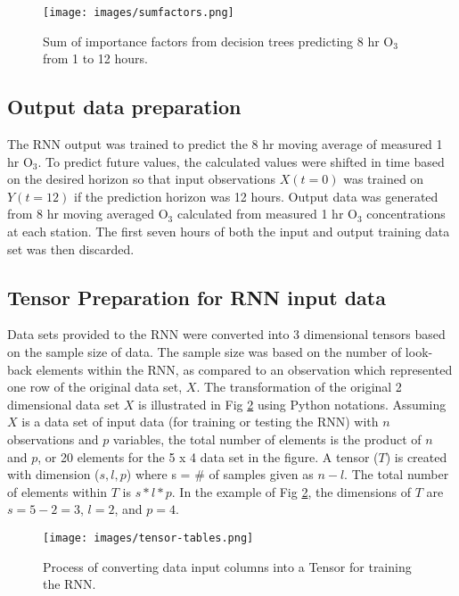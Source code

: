 %
\begin{figure}[H]
\centering
\texttt{[image: images/sumfactors.png]}
\caption[Decision tree importance factors]{Sum of importance factors from decision trees predicting 8 hr O$_{3}$ from 1 to 12 hours.}
\label{fig:importance}
\end{figure}
%
\subsection{Output data preparation}
The RNN output was trained to predict the 8 hr moving average of measured 1 hr O$_{3}$. To predict future values, the calculated values were shifted in time based on the desired horizon so that input observations $X(t=0)$ was trained on $Y(t=12)$ if the prediction horizon was 12 hours. Output data was generated from 8 hr moving averaged O$_{3}$ calculated from measured 1 hr O$_{3}$ concentrations at each station. The first seven hours of both the input and output training data set was then discarded. 

\subsection{Tensor Preparation for RNN input data}
Data sets provided to the RNN were converted into 3 dimensional tensors based on the sample size of data. The sample size was based on the number of look-back elements within the RNN, as compared to an observation which represented one row of the original data set, $X$.  The transformation of the original 2 dimensional data set $X$ is illustrated in Fig \ref{fig:tensor-tables} using Python notations. Assuming $X$ is a data set of input data (for training or testing the RNN) with $n$ observations and $p$ variables, the total number of elements is the product of $n$ and $p$, or 20 elements for the 5 x 4 data set in the figure. A tensor ($T$) is created with dimension ($s, l, p$) where s = \# of samples given as $n - l$. The total number of elements within $T$ is $s*l*p$. In the example of Fig \ref{fig:tensor-tables}, the dimensions of $T$ are $s = 5 - 2 = 3$, $l = 2$, and $p = 4$.    
%
\begin{figure}[H]
\centering
\texttt{[image: images/tensor-tables.png]}
\caption{Process of converting data input columns into a Tensor for training the RNN.}
\label{fig:tensor-tables}
\end{figure}
